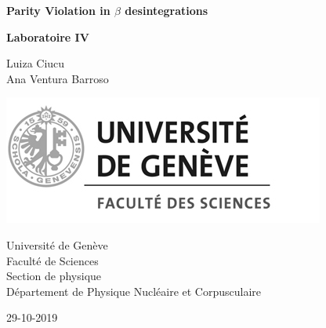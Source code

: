 \documentclass[10pt,swedish, openany]{book}
\begin{document}

\begin{titlepage}
	\clearpage\thispagestyle{empty}
	\centering
	\vspace{2cm}

	{\large  \par}
	\vspace{8cm}
        {\Huge \textbf{Parity Violation in $\beta$ desintegrations}} \\
	\vspace{1cm}
	{\large \textbf{Laboratoire IV} \par}
	\vspace{2cm}
	{\large Luiza Ciucu \\ %
	             Ana Ventura Barroso \par}
	\vspace{4cm}

    \includegraphics[scale=0.75]{logo.jpg}
    
    \vspace{4cm}
    
	{\normalsize Universit\'e de Gen\`eve \\ 
		Facult\'e de Sciences \\
		Section de physique \\
		D\'epartement de Physique Nucl\'eaire et Corpusculaire \par}
		
	{\normalsize 29-10-2019 \par}
	\vspace{2cm}
	
	\pagebreak

\end{titlepage}

\tableofcontents{}

\clearpage

\listoffigures
\end{document}
